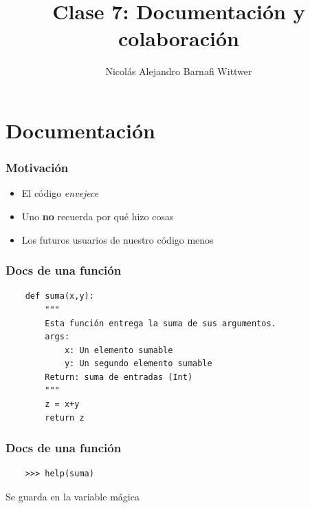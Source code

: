 \documentclass[14pt,aspectratio=169,xcolor=dvipsnames]{beamer}
\title[short title]{Clase 7: Documentación y colaboración}
\subtitle{}
\author[NA Barnafi] {Nicolás Alejandro Barnafi Wittwer}
\institute[UC|CMM] 
{
    Pontificia Universidad Católica de Chile \\
    Centro de Modelamiento Matemático
}
\date{}
\begin{document}
\begin{frame}
    \maketitle
\end{frame}
\section{Documentación}
\begin{frame}\frametitle{Motivación}
    \begin{itemize}
        \item El código \emph{envejece}
        \item Uno \textbf{no} recuerda por qué hizo cosas
        \item Los futuros usuarios de nuestro código \huge{menos}
    \end{itemize}
\end{frame}
\begin{frame}[fragile]\frametitle{Docs de una función}
    \begin{verbatim}
    def suma(x,y):
        """
        Esta función entrega la suma de sus argumentos. 
        args: 
            x: Un elemento sumable
            y: Un segundo elemento sumable
        Return: suma de entradas (Int)
        """
        z = x+y
        return z
    \end{verbatim}
\end{frame}
\begin{frame}[fragile]\frametitle{Docs de una función}
    \begin{verbatim}
    >>> help(suma)
    \end{verbatim}

    \vspace{1cm}
    Se guarda en la variable mágica 

\end{frame}
\end{document}
